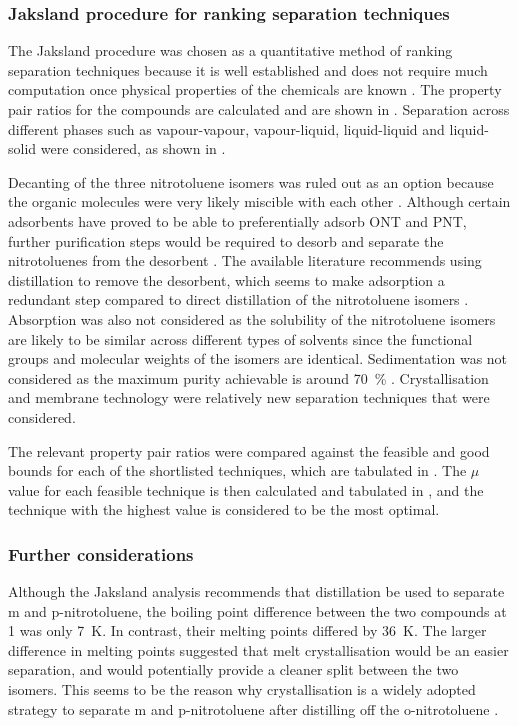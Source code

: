 \label{app:ntol separation}
\subsubsection{Jaksland procedure for ranking separation techniques}
The Jaksland procedure was chosen as a quantitative method of ranking separation techniques because it is well established and does not require much computation once physical properties of the chemicals are known \cite{jaksland_separation_1995}. The property pair ratios for the compounds are calculated and are shown in . Separation across different phases such as vapour-vapour, vapour-liquid, liquid-liquid and liquid-solid were considered, as shown in .

Decanting of the three nitrotoluene isomers was ruled out as an option because the organic molecules were very likely miscible with each other \cite{merck_solvent_2021}. Although certain adsorbents have proved to be able to preferentially adsorb ONT and PNT, further purification steps would be required to desorb and separate the nitrotoluenes from the desorbent \cite{zhao_new_2016}. The available literature recommends using distillation to remove the desorbent, which seems to make adsorption a redundant step compared to direct distillation of the nitrotoluene isomers \cite{zinnen_ep0181106a2_1984}. Absorption was also not considered as the solubility of the nitrotoluene isomers are likely to be similar across different types of solvents since the functional groups and molecular weights of the isomers are identical. Sedimentation was not considered as the maximum purity achievable is around \SI{70}{\percent} \cite{seider_product_2009}. Crystallisation and membrane technology were relatively new separation techniques that were considered. 

The relevant property pair ratios were compared against the feasible and good bounds for each of the shortlisted techniques, which are tabulated in . The $\mu$ value for each feasible technique is then calculated and tabulated in , and the technique with the highest value is considered to be the most optimal. 

\subsubsection{Further considerations}
Although the Jaksland analysis recommends that distillation be used to separate m and p-nitrotoluene, the boiling point difference between the two compounds at \SI{1}{\atm} was only \SI{7}{\K}. In contrast, their melting points differed by \SI{36}{\K}. The larger difference in melting points suggested that melt crystallisation would be an easier separation, and would potentially provide a cleaner split between the two isomers. This seems to be the reason why crystallisation is a widely adopted strategy to separate m and p-nitrotoluene after distilling off the o-nitrotoluene \cite{weiland_purification_1931,european_chemical_agency_background_2010}. 


